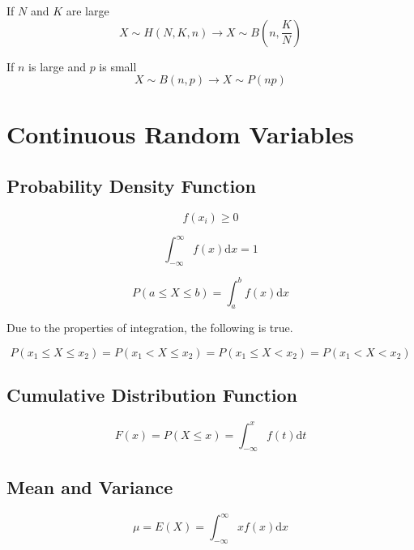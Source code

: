 \documentclass[a4paper, 10pt]{article}
\begin{document}
	If \(N\) and \(K\) are large
	\begin{equation*}
		X\sim H(N,K,n)\rightarrow X\sim B\left(n, \frac{K}{N}\right)
	\end{equation*}

	If \(n\) is large and \(p\) is small
	\begin{equation*}
		X\sim B(n,p)\rightarrow X\sim P(np)
	\end{equation*}

	\newpage
	\section{Continuous Random Variables}

	\subsection{Probability Density Function}

	\begin{equation*}
	f(x_{i})\geq 0
	\end{equation*}

	\begin{equation*}
	\int_{-\infty}^{\infty}f(x)\mathrm{d} x=1
	\end{equation*}

	\begin{equation*}
	P(a\leq X\leq b)=\int_{a}^{b}f(x)\mathrm{d} x
	\end{equation*}

	\noindent Due to the properties of integration, the following is true.

	\begin{equation*}
		P(x_1\leq X\leq x_2)=P(x_1 < X\leq x_2)=P(x_1\leq X < x_2)=P(x_1 < X < x_2)
	\end{equation*}

	\subsection{Cumulative Distribution Function}

	\begin{equation*}
		F(x) = P(X\leq x) = \int_{-\infty}^{x}f(t)\mathrm{d} t
	\end{equation*}

	\subsection{Mean and Variance}

	\begin{equation*}
	\mu = E(X) = \int_{-\infty}^{\infty}xf(x)\mathrm{d} x
	\end{equation*}
\end{document}
